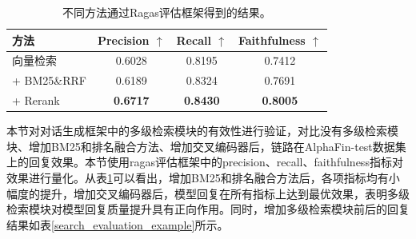 \begin{table}
	\caption{\label{search_module_evaluation}不同方法通过Ragas评估框架得到的结果。}
	\centering{}%
	\small 
	\begin{tabular}{lccc}
		\toprule[2pt]
		方法 & Precision $\uparrow$ & Recall $\uparrow$ & Faithfulness $\uparrow$ \\
		\hline
		向量检索 & 0.6028 & 0.8195 & 0.7412 \\
		+ BM25\&RRF & 0.6189 & 0.8324 & 0.7691 \\
		+ Rerank & \textbf{0.6717} & \textbf{0.8430} & \textbf{0.8005} \\
		\bottomrule[2pt]
	\end{tabular}
\end{table}

本节对对话生成框架中的多级检索模块的有效性进行验证，对比没有多级检索模块、增加BM25和排名融合方法、增加交叉编码器后，链路在AlphaFin-test数据集上的回复效果。本节使用ragas评估框架中的precision、recall、faithfulness指标对效果进行量化。从表\ref{search_module_evaluation}可以看出，增加BM25和排名融合方法后，各项指标均有小幅度的提升，增加交叉编码器后，模型回复在所有指标上达到最优效果，表明多级检索模块对模型回复质量提升具有正向作用。同时，增加多级检索模块前后的回复结果如表\ref{search_evaluation_example}所示。

